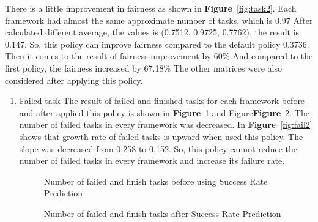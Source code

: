 \documentclass[12pt,oneside,openright,a4paper]{cpe-english-project}
\begin{document}
\hspace{10mm}There is a little improvement in fairness as shown in \textbf{Figure}~\ref{fig:task2}. Each framework had almost the same approximate number of tasks, which is 0.97 After calculated different average, the values is (0.7512, 0.9725, 0.7762), the result is 0.147. So, this policy can improve fairness compared to the default policy 0.3736. Then it comes to the result of fairness improvement by 60\% And compared to the first policy, the fairness increased by 67.18\%
\newline
The other matrices were also considered after applying this policy.
\begin{enumerate}
  \item Failed task
  \newline
  The result of failed and finished tasks for each framework before and after applied this policy is shown in \textbf{Figure}~\ref{fig:finfail0-2} and Figure\textbf{Figure}~\ref{fig:finfail2}. The number of failed tasks in every framework was decreased. In \textbf{Figure}~\ref{fig:fail2} shows that growth rate of failed tasks is upward when used this policy. The slope was decreased from 0.258 to 0.152. So, this policy cannot reduce the number of failed tasks in every framework and increase its failure rate. 
  \begin{figure}[!h]\centering
    \setlength{\fboxrule}{0mm} %
    \setlength{\fboxsep}{0cm}
    \caption{Number of failed and finish tasks before using Success Rate Prediction}\label{fig:finfail0-2}
\end{figure}
\begin{figure}[!h]\centering
    \setlength{\fboxrule}{0mm} %
    \setlength{\fboxsep}{0cm}
    \caption{Number of failed and finish tasks after Success Rate Prediction}\label{fig:finfail2}
\end{figure}

\end{enumerate}
\end{document}
